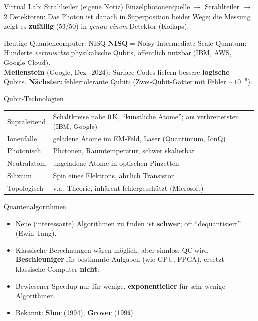\documentclass[a4paper, fontsize=7pt]{scrartcl}
\renewcommand*{\arraystretch}{1.5}  %
\begin{document}
\begin{subbox}{Virtual Lab: Strahlteiler (eigene Notiz)}
Einzelphotonenquelle $\to$ Strahlteiler $\to$ 2 Detektoren: Das Photon ist danach
in Superposition beider Wege; die Messung zeigt es \textbf{zufällig} (50/50) in
\emph{genau einem} Detektor (Kollaps).
\end{subbox}

\begin{mainbox}{Heutige Quantencomputer: NISQ}
\textbf{NISQ} = Noisy Intermediate-Scale Quantum: Hunderte \emph{verrauschte}
physikalische Qubits, öffentlich nutzbar (IBM, AWS, Google Cloud).\\
\textbf{Meilenstein} (Google, Dez.\ 2024): Surface Codes liefern bessere
\textbf{logische} Qubits. \textbf{Nächster:} fehlertolerante Qubits
(Zwei-Qubit-Gatter mit Fehler $\sim 10^{-6}$).
\end{mainbox}

\begin{subbox}{Qubit-Technologien}
\renewcommand*{\arraystretch}{1.1}
\setlength{\tabcolsep}{3pt}
\begin{tabularx}{\linewidth}{@{}l|>{\raggedright\arraybackslash}X@{}}
Supraleitend & Schaltkreise nahe 0\,K, ``künstliche Atome''; am
  verbreitetsten (IBM, Google) \\
Ionenfalle & geladene Atome im EM-Feld, Laser (Quantinuum, IonQ) \\
Photonisch & Photonen, Raumtemperatur, schwer skalierbar \\
Neutralatom & ungeladene Atome in optischen Pinzetten \\
Silizium & Spin eines Elektrons, ähnlich Transistor \\
Topologisch & v.a.\ Theorie, inhärent fehlergeschützt (Microsoft) \\
\end{tabularx}
\end{subbox}

\begin{mainbox}{Quantenalgorithmen}
\begin{itemize}
    \item Neue (interessante) Algorithmen zu finden ist \textbf{schwer}; oft
          ``dequantisiert'' (Ewin Tang).
    \item Klassische Berechnungen wären möglich, aber sinnlos: QC wird
          \textbf{Beschleuniger} für bestimmte Aufgaben (wie GPU, FPGA),
          ersetzt klassische Computer \textbf{nicht}.
    \item Bewiesener Speedup nur für wenige, \textbf{exponentieller} für sehr
          wenige Algorithmen.
    \item Bekannt: \textbf{Shor} (1994), \textbf{Grover} (1996).
\end{itemize}
\end{mainbox}
\end{document}
